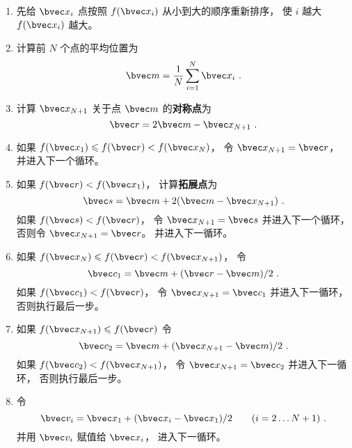 \begin{enumerate}
\item 先给 $\bvec x_i$ 点按照 $f(\bvec x_i)$ 从小到大的顺序重新排序， 使 $i$ 越大 $f(\bvec x_i)$ 越大。

\item 计算前 $N$ 个点的平均位置为
\begin{equation}
\bvec m = \frac1N \sum_{i=1}^N \bvec x_i~.
\end{equation}

\item 计算 $\bvec x_{N + 1}$ 关于点 $\bvec m$ 的\textbf{对称点}为
\begin{equation}
\bvec r = 2\bvec m - \bvec x_{N + 1}~.
\end{equation}

\item 如果 $f(\bvec x_1) \leqslant f(\bvec r) < f(\bvec x_N)$， 令 $\bvec x_{N+1} = \bvec r$， 并进入下一个循环。

\item 如果 $f(\bvec r) < f(\bvec x_1)$， 计算\textbf{拓展点}为
\begin{equation}
\bvec s = \bvec m + 2(\bvec m - \bvec x_{N+1})~.
\end{equation}
如果 $f(\bvec s) < f(\bvec r)$， 令 $\bvec x_{N+1} = \bvec s$ 并进入下一个循环， 否则令 $\bvec x_{N+1} = \bvec r$。 并进入下一循环。

\item 如果 $f(\bvec x_N) \leqslant f(\bvec r) < f(\bvec x_{N+1})$， 令
\begin{equation}
\bvec c_1 = \bvec m + (\bvec r - \bvec m)/2~.
\end{equation}
如果 $f(\bvec c_1) < f(\bvec r)$， 令 $\bvec x_{N + 1} = \bvec c_1$ 并进入下一循环， 否则执行最后一步。

\item 如果 $f(\bvec x_{N+1}) \leqslant f(\bvec r)$ 令
\begin{equation}
\bvec c_2 = \bvec m + (\bvec x_{N+1} - \bvec m)/2~.
\end{equation}
如果 $f(\bvec c_2) < f(\bvec x_{N+1})$， 令 $\bvec x_{N+1}  = \bvec c_2$ 并进入下一循环， 否则执行最后一步。

\item 令
\begin{equation}
\bvec v_i = \bvec x_1 + (\bvec x_i - \bvec x_1)/2 \qquad (i = 2\dots N+1)~.
\end{equation}
并用 $\bvec v_i$ 赋值给 $\bvec x_i$， 进入下一循环。
\end{enumerate}


